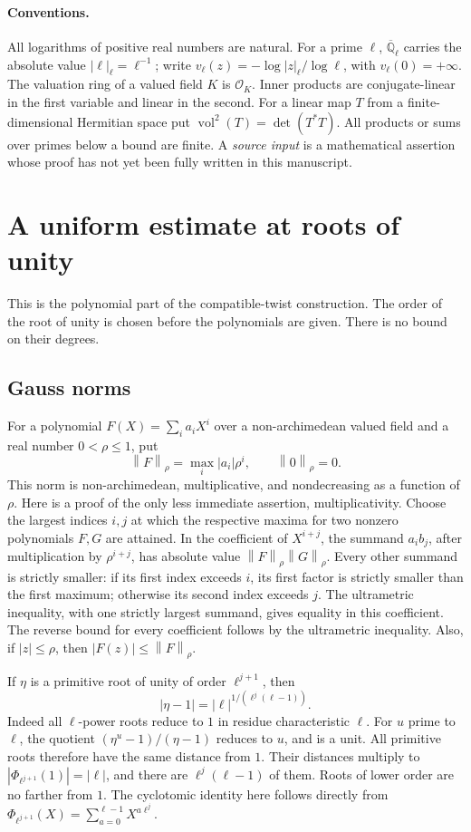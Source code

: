 \documentclass[11pt,a4paper]{article}
\theoremstyle{definition}
\newcommand{\Q}{\mathbb Q}
\newcommand{\vnorm}[1]{\left\lVert#1\right\rVert}
\newcommand{\abs}[1]{\left|#1\right|}
\newcommand{\volsq}{\operatorname{vol}^{2}}
\begin{document}
\paragraph{Conventions.}
All logarithms of positive real numbers are natural. For a prime \(\ell\),
\(\overline{\Q}_\ell\) carries the absolute value \(\abs{\ell}_\ell=\ell^{-1}\);
write \(v_\ell(z)=-\log\abs z_\ell/\log\ell\), with \(v_\ell(0)=+\infty\).
The valuation ring of a valued field \(K\) is \(\mathcal O_K\).
Inner products are conjugate-linear in the first variable and linear in the second.
For a linear map \(T\) from a finite-dimensional Hermitian space put
\(\volsq(T)=\det(T^*T)\). All products or sums over primes below a bound are finite.
A \emph{source input} is a mathematical assertion whose proof has not yet been
fully written in this manuscript.


\section{A uniform estimate at roots of unity}\label{sec:torsion}
This is the polynomial part of the compatible-twist construction.
The order of the root of unity is chosen before the polynomials are given.
There is no bound on their degrees.

\subsection{Gauss norms}
For a polynomial \(F(X)=\sum_i a_iX^i\) over a non-archimedean valued field and
a real number \(0<\rho\le1\), put
\[
 \vnorm{F}_\rho=\max_i \abs{a_i}\rho^i,\qquad \vnorm0_\rho=0.
\]
This norm is non-archimedean, multiplicative, and nondecreasing as a function of
\(\rho\). Here is a proof of the only less immediate assertion, multiplicativity.
Choose the largest indices \(i,j\) at which the respective maxima for two nonzero
polynomials \(F,G\) are attained. In the coefficient of \(X^{i+j}\), the summand
\(a_i b_j\), after multiplication by \(\rho^{i+j}\), has absolute value
\(\vnorm F_\rho\vnorm G_\rho\). Every other summand is strictly smaller:
if its first index exceeds \(i\), its first factor is strictly smaller than the
first maximum; otherwise its second index exceeds \(j\). The ultrametric
inequality, with one strictly largest summand, gives equality in this coefficient.
The reverse bound for every coefficient follows by the ultrametric inequality.
Also, if \(\abs z\le\rho\), then \(\abs{F(z)}\le\vnorm F_\rho\).

If \(\eta\) is a primitive root of unity of order \(\ell^{j+1}\), then
\begin{equation}\label{eq:torsion-radius}
 \abs{\eta-1}=\abs\ell^{1/(\ell^j(\ell-1))}.
\end{equation}
Indeed all \(\ell\)-power roots reduce to \(1\) in residue characteristic \(\ell\).
For \(u\) prime to \(\ell\), the quotient
\((\eta^u-1)/(\eta-1)\) reduces to \(u\), and is a unit.
All primitive roots therefore have the same distance from \(1\).
Their distances multiply to \(\abs{\Phi_{\ell^{j+1}}(1)}=\abs\ell\), and
there are \(\ell^j(\ell-1)\) of them. Roots of lower order are no farther from \(1\).
The cyclotomic identity here follows directly from
\(\Phi_{\ell^{j+1}}(X)=\sum_{a=0}^{\ell-1}X^{a\ell^j}\).
\end{document}
